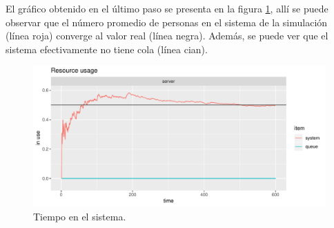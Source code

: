 El gráfico obtenido en el último paso se presenta en la figura \ref{fig:res}, allí se puede observar que el número promedio de personas en el sistema  de la simulación (línea roja) converge al valor real (línea negra). Además, se puede ver que el sistema efectivamente no tiene cola (línea cian).

\begin{figure}[H]
    \centering
    \includegraphics[scale=.75]{figs/Rplot.pdf}
    \caption{Tiempo en el sistema.}
    \label{fig:res}
\end{figure}